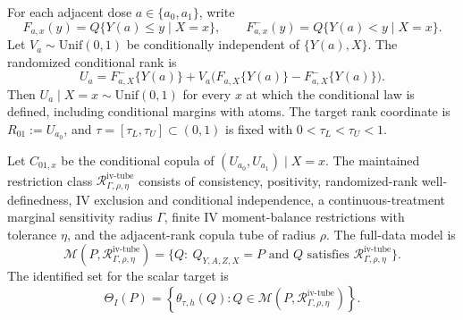 \documentclass[11pt]{article}
\theoremstyle{definition}
\theoremstyle{plain}
\theoremstyle{remark}
\begin{document}
For each adjacent dose \(a\in\{a_0,a_1\}\), write
\[
F_{a,x}(y)=Q\{Y(a)\le y\mid X=x\},\qquad
F^-_{a,x}(y)=Q\{Y(a)<y\mid X=x\}.
\]
Let \(V_a\sim\mathrm{Unif}(0,1)\) be conditionally independent of \(\{Y(a),X\}\).  The randomized conditional rank is
\[
U_a=F^-_{a,X}\{Y(a)\}+V_a\bigl(F_{a,X}\{Y(a)\}-F^-_{a,X}\{Y(a)\}\bigr).
\]
Then \(U_a\mid X=x\sim\mathrm{Unif}(0,1)\) for every \(x\) at which the conditional law is defined, including conditional margins with atoms.  The target rank coordinate is \(R_{01}:=U_{a_0}\), and \(\tau=[\tau_L,\tau_U]\subset(0,1)\) is fixed with \(0<\tau_L<\tau_U<1\).

Let \(C_{01,x}\) be the conditional copula of \((U_{a_0},U_{a_1})\mid X=x\).  The maintained restriction class \(\mathcal R_{\Gamma,\rho,\eta}^{\mathrm{iv\text{-}tube}}\) consists of consistency, positivity, randomized-rank well-definedness, IV exclusion and conditional independence, a continuous-treatment marginal sensitivity radius \(\Gamma\), finite IV moment-balance restrictions with tolerance \(\eta\), and the adjacent-rank copula tube of radius \(\rho\).  The full-data model is
\[
\mathcal M(P,\mathcal R_{\Gamma,\rho,\eta}^{\mathrm{iv\text{-}tube}})
=\{Q:\ Q_{Y,A,Z,X}=P\text{ and }Q\text{ satisfies }\mathcal R_{\Gamma,\rho,\eta}^{\mathrm{iv\text{-}tube}}\}.
\]
The identified set for the scalar target is
\[
\Theta_I(P)=
\left\{\theta_{\tau,h}(Q):Q\in\mathcal M(P,\mathcal R_{\Gamma,\rho,\eta}^{\mathrm{iv\text{-}tube}})\right\}.
\]
\end{document}
